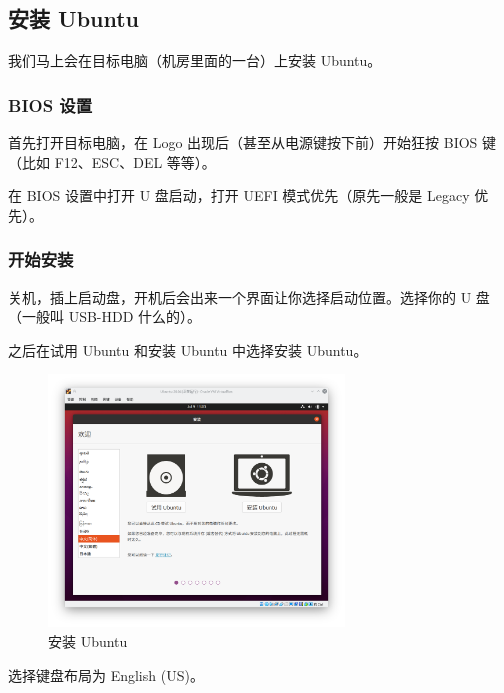 \documentclass[UTF-8]{ctexart}
\begin{document}
		\subsection{安装 Ubuntu}
		
			我们马上会在目标电脑（机房里面的一台）上安装 Ubuntu。
		
			\subsubsection{BIOS 设置}
			
				首先打开目标电脑，在 Logo 出现后（甚至从电源键按下前）开始狂按 BIOS 键（比如 F12、ESC、DEL 等等）。
				
				在 BIOS 设置中打开 U 盘启动，打开 UEFI 模式优先（原先一般是 Legacy 优先）。
			
			\subsubsection{开始安装}
				
				关机，插上启动盘，开机后会出来一个界面让你选择启动位置。选择你的 U 盘（一般叫 USB-HDD 什么的）。
				
				之后在试用 Ubuntu 和安装 Ubuntu 中选择安装 Ubuntu。
				
				\begin{figure}[H]
					\centering
					\includegraphics[width=0.7\textwidth]{fig/ubuntu_install_1.png}
					\caption*{安装 Ubuntu}
				\end{figure}
			
				选择键盘布局为 English (US)。
			
\end{document}
